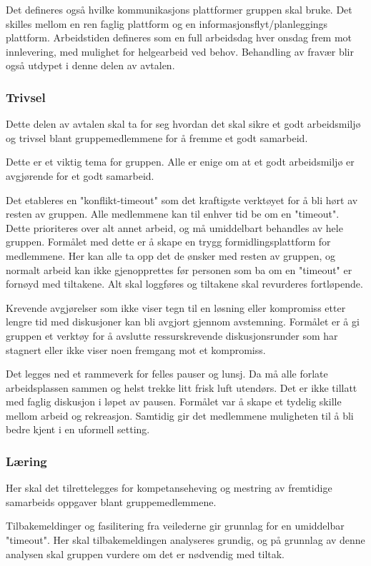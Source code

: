 Det defineres også hvilke kommunikasjons plattformer gruppen skal bruke. Det skilles mellom en ren faglig plattform og en informasjonsflyt/planleggings plattform. Arbeidstiden defineres som en full arbeidsdag hver onsdag frem mot innlevering, med mulighet for helgearbeid ved behov. Behandling av fravær blir også utdypet i denne delen av avtalen.

\subsubsection{Trivsel}
Dette delen av avtalen skal ta for seg hvordan det skal sikre et godt arbeidsmiljø og trivsel blant gruppemedlemmene for å fremme et godt samarbeid.

Dette er et viktig tema for gruppen. Alle er enige om at et godt arbeidsmiljø er avgjørende for et godt samarbeid. 

Det etableres en "konflikt-timeout" som det kraftigste verktøyet for å bli hørt av resten av gruppen. Alle medlemmene kan til enhver tid be om en "timeout". Dette prioriteres over alt annet arbeid, og må umiddelbart behandles av hele gruppen. Formålet med dette er å skape en trygg formidlingsplattform for medlemmene. Her kan alle ta opp det de ønsker med resten av gruppen, og normalt arbeid kan ikke gjenopprettes før personen som ba om en "timeout" er fornøyd med tiltakene. Alt skal loggføres og tiltakene skal revurderes fortløpende.

Krevende avgjørelser som ikke viser tegn til en løsning eller kompromiss etter lengre tid med diskusjoner kan bli avgjort gjennom avstemning. Formålet er å gi gruppen et verktøy for å avslutte ressurskrevende diskusjonsrunder som har stagnert eller ikke viser noen fremgang mot et kompromiss.

Det legges ned et rammeverk for felles pauser og lunsj. Da må alle forlate arbeidsplassen sammen og helst trekke litt frisk luft utendørs. Det er ikke tillatt med faglig diskusjon i løpet av pausen. Formålet var å skape et tydelig skille mellom arbeid og rekreasjon. Samtidig gir det medlemmene muligheten til å bli bedre kjent i en uformell setting.

\subsubsection{Læring}
Her skal det tilrettelegges for kompetanseheving og mestring av fremtidige samarbeids oppgaver blant gruppemedlemmene.

Tilbakemeldinger og fasilitering fra veilederne gir grunnlag for en umiddelbar "timeout". Her skal tilbakemeldingen analyseres grundig, og på grunnlag av denne analysen skal gruppen vurdere om det er nødvendig med tiltak. 

